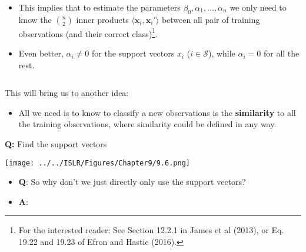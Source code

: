 \documentclass[10pt,ignorenonframetext,]{beamer}
\providecommand{\tightlist}{%
  \setlength{\itemsep}{0pt}\setlength{\parskip}{0pt}}
\begin{document}
\begin{frame}

\begin{itemize}
\item
  This implies that to estimate the parameters
  \(\beta_0,\alpha_1,...,\alpha_n\) we only need to know the
  \({n \choose 2}\) inner products
  \(\langle {\boldsymbol x}_i,{\boldsymbol x}_i' \rangle\) between all
  pair of training observations (and their correct
  class)\footnote{For the interested reader: See Section 12.2.1 in James et al (2013), or Eq. 19.22 and 19.23 of Efron and Hastie (2016).}.
\item
  Even better, \(\alpha_i \neq 0\) for the support vectors \(x_i\)
  (\(i \in \mathcal{S}\)), while \(\alpha_i=0\) for all the rest.
\end{itemize}

\(~\)

This will bring us to another idea:

\begin{itemize}
\tightlist
\item
  All we need is to know to classify a new observations is the
  \textbf{similarity} to all the training observations, where similarity
  could be defined in any way.
\end{itemize}

\end{frame}

\begin{frame}

\textbf{Q:} Find the support vectors

\texttt{[image: ../../ISLR/Figures/Chapter9/9.6.png]}

\begin{itemize}
\tightlist
\item
  \textbf{Q}: So why don't we just directly only use the support
  vectors?
\item
  \textbf{A}: 
\end{itemize}

\end{frame}
\end{document}
